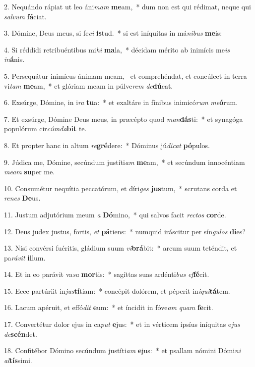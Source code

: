 2. Nequándo rápiat ut leo áni\textit{mam} \textbf{me}am,~*  dum non est qui rédimat, neque qui \textit{sal}\textit{vum} \textbf{fá}ciat.\

3. Dómine, Deus meus, si fe\textit{ci} \textbf{is}tud.~*  si est iníquitas in má\textit{ni}\textit{bus} \textbf{me}is:\

4. Si réddidi retribuéntibus mi\textit{hi} \textbf{ma}la,~*  décidam mérito ab inimícis me\textit{is} \textit{in}\textbf{á}nis.\

5. Persequátur inimícus ánimam meam, \dag\  et comprehéndat, et concúlcet in terra vi\textit{tam} \textbf{me}am,~*  et glóriam meam in púlve\textit{rem} \textit{de}\textbf{dú}cat.\

6. Exsúrge, Dómine, in i\textit{ra} \textbf{tu}a:~*  et exaltáre in fínibus inimicó\textit{rum} \textit{me}\textbf{ó}rum.\

7. Et exsúrge, Dómine Deus meus, in præcépto quod \textit{man}\textbf{dás}ti:~*  et synagóga populórum cir\textit{cúm}\textit{da}\textbf{bit} te.\

8. Et propter hanc in altum \textit{re}\textbf{gré}dere:~*  Dóminus jú\textit{di}\textit{cat} \textbf{pó}pulos.\

9. Júdica me, Dómine, secúndum justíti\textit{am} \textbf{me}am,~*  et secúndum innocéntiam \textit{me}\textit{am} \textbf{su}per me.\

10. Consumétur nequítia peccatórum, et díri\textit{ges} \textbf{jus}tum,~*  scrutans corda et \textit{re}\textit{nes} \textbf{De}us.\

11. Justum adjutórium meum \textit{a} \textbf{Dó}mino,~*  qui salvos facit \textit{rec}\textit{tos} \textbf{cor}de.\

12. Deus judex justus, fortis, \textit{et} \textbf{pá}tiens:~*  numquid iráscitur per sín\textit{gu}\textit{los} \textbf{di}es?\

13. Nisi convérsi fuéritis, gládium suum \textit{vi}\textbf{brá}bit:~*  arcum suum teténdit, et pa\textit{rá}\textit{vit} \textbf{il}lum.\

14. Et in eo parávit va\textit{sa} \textbf{mor}tis:~*  sagíttas suas ardénti\textit{bus} \textit{ef}\textbf{fé}cit.\

15. Ecce partúriit in\textit{jus}\textbf{tí}tiam:~*  concépit dolórem, et péperit in\textit{i}\textit{qui}\textbf{tá}tem.\

16. Lacum apéruit, et effó\textit{dit} \textbf{e}um:~*  et íncidit in fóve\textit{am} \textit{quam} \textbf{fe}cit.\

17. Convertétur dolor ejus in ca\textit{put} \textbf{e}jus:~*  et in vérticem ipsíus iníquitas e\textit{jus} \textit{de}\textbf{scén}det.\

18. Confitébor Dómino secúndum justíti\textit{am} \textbf{e}jus:~*  et psallam nómini Dómi\textit{ni} \textit{al}\textbf{tís}simi.\

